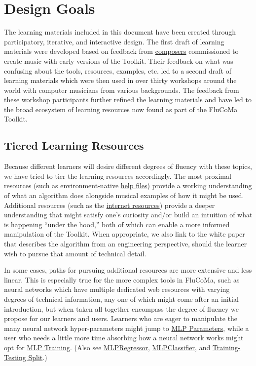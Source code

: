 \documentclass{article}
\begin{document}
\section{Design Goals}

The learning materials included in this document have been created
through participatory, iterative, and interactive design. The first
draft of learning materials were developed based on feedback from
\href{https://www.flucoma.org/commissions/}{composers} commissioned to
create music with early versions of the Toolkit. Their feedback on what
was confusing about the tools, resources, examples, etc. led to a second
draft of learning materials which were then used in over thirty
workshops around the world with computer musicians from various
backgrounds. The feedback from these workshop participants further
refined the learning materials and have led to the broad ecosystem of
learning resources now found as part of the FluCoMa Toolkit.

\subsection{Tiered Learning Resources}\label{tiered-learning-resources}

Because different learners will desire different degrees of fluency with
these topics, we have tried to tier the learning resources accordingly.
The most proximal resources (such as environment-native
\hyperref[creative-coding-environment-materials]{help files}) provide a
working understanding of what an algorithm does alongside musical
examples of how it might be used. Additional resources (such as the
\hyperref[web-reference]{internet resources}) provide a deeper
understanding that might satisfy one's curiosity and/or build an
intuition of what is happening ``under the hood,'' both of which can
enable a more informed manipulation of the Toolkit. When appropriate, we
also link to the white paper that describes the algorithm from an
engineering perspective, should the learner wish to pursue that amount
of technical detail.

In some cases, paths for pursuing additional resources are more
extensive and less linear. This is especially true for the more complex
tools in FluCoMa, such as neural networks which have multiple dedicated
web resources with varying degrees of technical information, any one of
which might come after an initial introduction, but when taken all
together encompass the degree of fluency we propose for our learners and
users. Learners who are eager to manipulate the many neural network
hyper-parameters might jump to
\href{https://learn.flucoma.org/learn/mlp-parameters/}{MLP Parameters},
while a user who needs a little more time absorbing how a neural network
works might opt for
\href{https://learn.flucoma.org/learn/mlp-training/}{MLP Training}.
(Also see
\href{https://learn.flucoma.org/reference/mlpregressor/}{MLPRegressor},
\href{https://learn.flucoma.org/reference/mlpclassifier/}{MLPClassifier},
and
\href{https://learn.flucoma.org/learn/training-testing-split/}{Training-Testing
Split}.)
\end{document}
